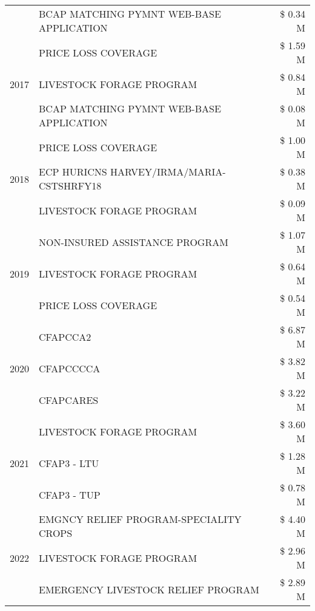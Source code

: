 \begin{tabular}{llr}
 & BCAP MATCHING PYMNT WEB-BASE APPLICATION & \$ 0.34 M \\
\cline{1-3}
\multirow[t]{3}{*}{2017} & PRICE LOSS COVERAGE & \$ 1.59 M \\
 & LIVESTOCK FORAGE PROGRAM & \$ 0.84 M \\
 & BCAP MATCHING PYMNT WEB-BASE APPLICATION & \$ 0.08 M \\
\cline{1-3}
\multirow[t]{3}{*}{2018} & PRICE LOSS COVERAGE & \$ 1.00 M \\
 & ECP HURICNS HARVEY/IRMA/MARIA-CSTSHRFY18 & \$ 0.38 M \\
 & LIVESTOCK FORAGE PROGRAM & \$ 0.09 M \\
\cline{1-3}
\multirow[t]{3}{*}{2019} & NON-INSURED ASSISTANCE PROGRAM & \$ 1.07 M \\
 & LIVESTOCK FORAGE PROGRAM & \$ 0.64 M \\
 & PRICE LOSS COVERAGE & \$ 0.54 M \\
\cline{1-3}
\multirow[t]{3}{*}{2020} & CFAPCCA2 & \$ 6.87 M \\
 & CFAPCCCCA & \$ 3.82 M \\
 & CFAPCARES & \$ 3.22 M \\
\cline{1-3}
\multirow[t]{3}{*}{2021} & LIVESTOCK FORAGE PROGRAM & \$ 3.60 M \\
 & CFAP3 - LTU & \$ 1.28 M \\
 & CFAP3 - TUP & \$ 0.78 M \\
\cline{1-3}
\multirow[t]{3}{*}{2022} & EMGNCY RELIEF PROGRAM-SPECIALITY CROPS & \$ 4.40 M \\
 & LIVESTOCK FORAGE PROGRAM & \$ 2.96 M \\
 & EMERGENCY LIVESTOCK RELIEF PROGRAM & \$ 2.89 M \\
\cline{1-3}
\bottomrule
\end{tabular}
